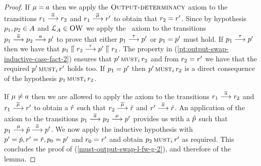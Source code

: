 \begin{proof}
  If $\mu = \aa$ then we apply the $\outputdeterminacy$ axiom to the transitions
  $\client_1 \st{\co{\aa}} \client_2$ and $\client_1 \st{\co{\mu}} \client'$ to obtain
  that $\client_2 = \client'$.
  Since by hypothesis $\server_1, \server_2 \in \StatesA$ and $\genlts_\StatesA \in
  \obaFW$ we apply the \fwdfeedback\ axiom to the transitions
  $\server_1 \st{\co{\aa}} \server_2 \st{\aa} \server'$ to prove that 
  either $\server_1 \st{\tau} \server'$ or $\server_1 = \serverA'$ must hold.
  If $\server_1 \st{\tau} \server'$ then we have that
  $\csys{\server_1}{\client_2} \st{\tau} \csys{\server'}{\client_2}$.
  The property in (\ref{pt:output-swap-inductive-case-fact-2}) ensures that
  $\musti{\server'}{\client_2}$ and from $\client_2 = \client'$ we have that
  the required $\musti{\server'}{\client'}$ holds too.
  If $\serverA_1 = \serverA'$ then $\musti{\serverA'}{\client_2}$
  is a direct consequence of the hypothesis $\musti{\serverA_1}{\client_2}$.

  If $\mu \neq \aa$ then we are allowed to apply the
  \outputconfluence axiom to the transitions
  $\client_1 \st{\co{\aa}} \client_2$ and $\client_1 \st{\co{\mu}} \client'$
  to obtain a $\hat{\client}$ such that
  $\client_2 \st{\co{\mu}} \hat{\client}$
  and $\client' \st{\co{\aa}} \hat{\client}$.
  An application of the \outputcommutativity axiom to the transitions
  $\server_1 \st{\co{\aa}} \server_2 \st{\mu} \server'$
  provides us with a $\hat{\server}$ such that
  $\server_1 \st{\mu} \hat{\server} \st{\co{\aa}} \server'$.
  We now apply the inductive hypothesis with
  $\serverA' = \hat{\serverA}, \client' = \hat{\client}, \serverA_0 = \serverA'$
  and $\client_0 = \client'$ and obtain $\musti{\serverA_2}{\client'}$
  as required. This concludes the proof of
  (\ref{must-output-swap-l-fw-g-2}),
  and therefore of the lemma.
\end{proof}


